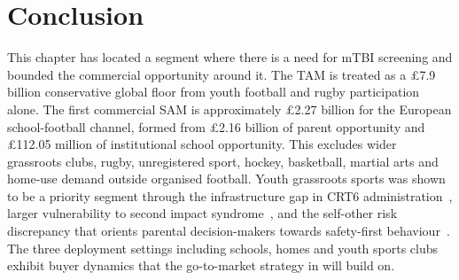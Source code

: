 \section{Conclusion}
This chapter has located a segment where there is a need for mTBI screening and bounded the commercial opportunity around it. The TAM is treated as a \pounds{}7.9 billion conservative global floor from youth football and rugby participation alone. The first commercial SAM is approximately \pounds{}2.27 billion for the European school-football channel, formed from \pounds{}2.16 billion of parent opportunity and \pounds{}112.05 million of institutional school opportunity. This excludes wider grassroots clubs, rugby, unregistered sport, hockey, basketball, martial arts and home-use demand outside organised football. Youth grassroots sports was shown to be a priority segment through the infrastructure gap in CRT6 administration~\cite{echemendia2023crt6}, larger vulnerability to second impact syndrome~\cite{patricios2023amsterdam}, and the self-other risk discrepancy that orients parental decision-makers towards safety-first behaviour~\cite{stone2013selfother,dore2014parental}. The three deployment settings including schools, homes and youth sports clubs exhibit buyer dynamics that the go-to-market strategy in  will build on.
